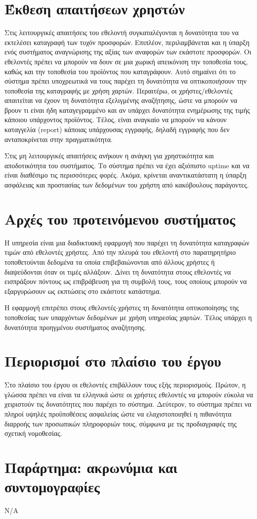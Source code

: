 \documentclass[a4paper,oneside, 12pt]{article}
\begin{document}
\section{Έκθεση απαιτήσεων χρηστών}
Στις λειτουργικές απαιτήσεις του εθελοντή συγκαταλέγονται η δυνατότητα του να εκτελέσει καταγραφή των τυχόν προσφορών. Επιπλέον, περιλαμβάνεται και η ύπαρξη ενός συστήματος αναγνώρισης της αξίας των αναφορών των εκάστοτε προσφορών. Οι εθελοντές πρέπει να μπορούν να δουν σε μια χωρική απεικόνιση την τοποθεσία τους, καθώς και την τοποθεσία του προϊόντος που καταγράφουν. Αυτό σημαίνει ότι το σύστημα πρέπει υποχρεωτικά να τους παρέχει τη δυνατότητα να οπτικοποιήσουν την τοποθεσία της καταγραφής με χρήση χαρτών. Περαιτέρω, οι χρήστες/εθελοντές απαιτείται να έχουν τη δυνατότητα εξελιγμένης αναζήτησης, ώστε να μπορούν να βρουν τι είναι ήδη καταγεγραμμένο και αν υπάρχει δυνατότητα ενημέρωσης της τιμής κάποιου υπάρχοντος προϊόντος. Τέλος, είναι αναγκαίο να μπορούν να κάνουν καταγγελία (report) κάποιας υπάρχουσας εγγραφής, δηλαδή εγγραφής που δεν ανταποκρίνεται στην πραγματικότητα.

Στις μη λειτουργικές απαιτήσεις ανήκουν η ανάγκη για χρηστικότητα και αποδοτικότητα του συστήματος. Το σύστημα πρέπει να έχει αξιόπιστο uptime και να είναι διαθέσιμο τις περισσότερες φορές. Ακόμα, κρίνεται αναντικατάστατη η ύπαρξη ασφάλειας και προστασίας των δεδομένων του χρήστη από κακόβουλους παράγοντες.   

\section{Αρχές του προτεινόμενου συστήματος}

Η υπηρεσία είναι μια διαδικτυακή εφαρμογή που παρέχει τη δυνατότητα καταγραφών τιμών από εθελοντές χρήστες. Από την πλευρά του εθελοντή στο παρατηρητήριο  τοποθετούνται δεδομένα τα οποία επιβεβαιώνονται από άλλους χρήστες ή διαψεύδονται όταν οι τιμές αλλάξουν. Δίνει τη δυνατότητα στους εθελοντές να εισπράξουν πόντους ως επιβράβευση για τη συμβολή τους, τους οποίους μπορούν να εξαργυρώσουν ως εκπτώσεις στο εκάστοτε κατάστημα. 

Η εφαρμογή επιτρέπει στους εθελοντές-χρήστες τη δυνατότητα οπτικοποίησης της τοποθεσίας των υπαρχόντων δεδομένων με χρήση υπηρεσίας χαρτών. Τέλος υπάρχει η δυνατότητα προηγμένου συστήματος αναζήτησης.

\section{Περιορισμοί στο πλαίσιο του έργου}

Στο πλαίσιο του έργου οι εθελοντές επιβάλλουν τους εξής περιορισμούς. Πρώτον, η γλώσσα πρέπει να είναι τα ελληνικά ώστε οι χρήστες εθελοντές να μπορούν εύκολα να χειριστούν τις δυνατότητες που παρέχει το σύστημα. Δεύτερον, το σύστημα πρέπει να πληροί υψηλές προϋποθέσεις ασφαλείας ώστε να ελαχιστοποιηθεί η πιθανότητα διαρροής των προσωπικών πληροφοριών τους, σύμφωνα με τις προδιαγραφές της σχετική νομοθεσίας.

\section{Παράρτημα: ακρωνύμια και συντομογραφίες}

Ν/Α
\end{document}
